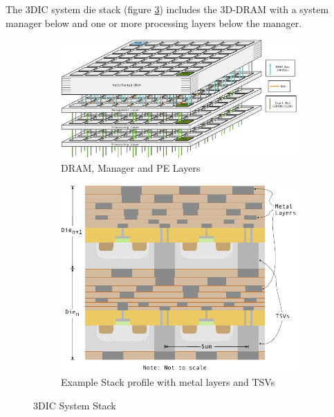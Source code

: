 \documentclass[journal]{IEEEtran}
\begin{document}
The 3DIC system die stack (figure \ref{fig:3DICStack}) includes the 3D-DRAM with a system manager below and one or more processing layers below the manager.
\begin{figure}
\centering
\begin{subfigure}{.5\textwidth}
  \centering
  \includegraphics[width=1\textwidth]{StackDiagram.jpg}
  \captionsetup{justification=centering, width=.8\linewidth}
  \caption{DRAM, Manager and PE Layers}
  \label{fig:3DICStack}
\end{subfigure}%

\bigskip

\begin{subfigure}{.35\textwidth}
  \centering
  \includegraphics[width=1\textwidth]{TSVs.pdf}
  \captionsetup{justification=centering, width=1\linewidth}
  \caption{Example Stack profile with metal layers and TSVs \cite{itrs2015_interconn}}
  \label{fig:tsv}
\end{subfigure}
\captionsetup{justification=centering, width=.9\linewidth}
\caption{3DIC System Stack}
\label{fig:3DICStack}
\end{figure}
\end{document}
